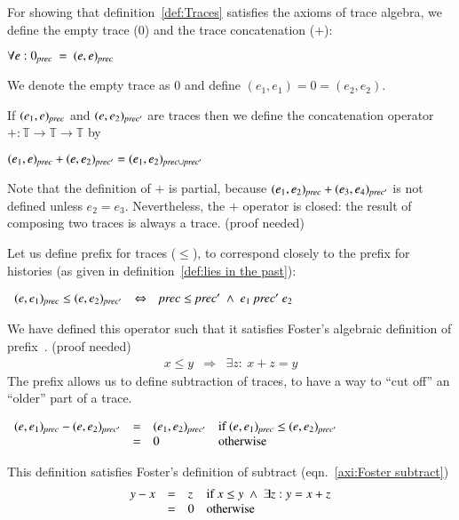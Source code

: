 \documentclass{elsarticle}
\def\id#1{\text{\it #1\/}}
\begin{document}
	For showing that definition~\ref{def:Traces} satisfies the axioms of trace algebra,
	we define the empty trace ($0$) and the trace concatenation ($+$):
\begin{definition}
\label{def:Empty trace}
\item   $\forall e: 0_\id{prec}\ =\ (e,e)_\id{prec}$
\end{definition}
	We denote the empty trace as $0$ and define $(e_1,e_1)=0=(e_2,e_2)$.

	If $(e_1,e)_\id{prec}$ and $(e,e_2)_{\id{prec}'}$ are traces then
	we define the concatenation operator $+:\mathbb T\rightarrow\mathbb T\rightarrow\mathbb T$ by
\begin{definition}
\label{def:concatenation}
\item   $(e_1,e)_\id{prec}+(e,e_2)_{\id{prec}'}=(e_1,e_2)_{\id{prec}\cup\id{prec}'}$
\end{definition}
	Note that the definition of $+$ is partial, because $(e_1,e_2)_\id{prec}+(e_3,e_4)_{\id{prec}'}$ is not defined unless $e_2=e_3$.
	Nevertheless, the $+$ operator is closed: the result of composing two traces is always a trace.
	(proof needed)

	Let us define prefix for traces ($\leq$), to correspond closely to the prefix for histories
	(as given in definition~\ref{def:lies in the past}):
\begin{definition}[Prefix]
\label{def:Prefix of traces}
\item $\begin{array}[t]{rcl}
	(e,e_1)_\id{prec}\leq(e,e_2)_{\id{prec}'}&\Leftrightarrow&\id{prec}\leq\id{prec}'\ \wedge\ e_1\ \id{prec}'\ e_2
\end{array}$
\end{definition}
	We have defined this operator such that it satisfies Foster's algebraic definition of prefix~\cite{Foster17b}.
	(proof needed)
\begin{eqnarray}
	x\leq y&\Rightarrow&\exists z:\ x+z=y\label{def:Prefix}
\end{eqnarray}
	The prefix allows us to define subtraction of traces, to have a way to ``cut off'' an ``older'' part of a trace.
\begin{definition}[Subtract]
\label{def:Subtract}
\item $\begin{array}[t]{rcll}
	(e,e_1)_\id{prec}-(e,e_2)_{\id{prec}'}&=&(e_1,e_2)_{\id{prec}'}&\text{if }(e,e_1)_\id{prec}\leq(e,e_2)_{\id{prec}'}\\
	   &=&0&\text{otherwise}
\end{array}$
\end{definition}
	This definition satisfies Foster's definition of subtract (eqn.~\ref{axi:Foster subtract})
\begin{equation}
\label{axi:Foster subtract}
\begin{array}[t]{rcll}
	y-x&=&z&\text{if }x\leq y\ \wedge\ \exists z: y=x+z\\
	   &=&0&\text{otherwise}
\end{array}
\end{equation}
\end{document}
